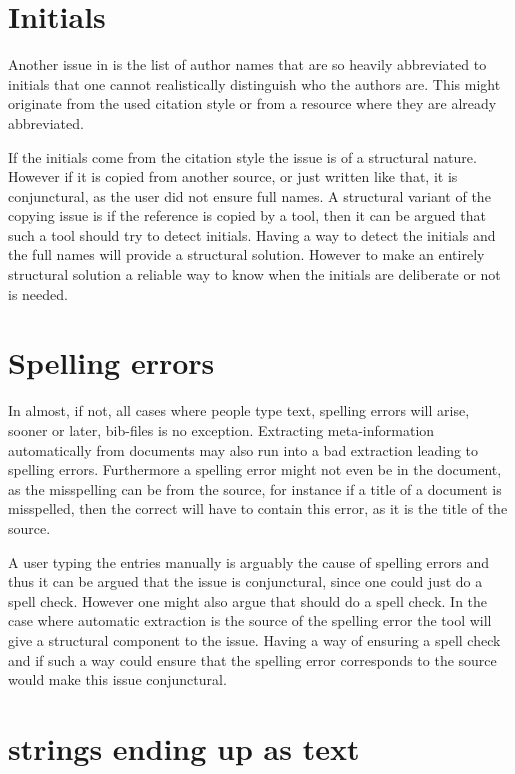 \section{Initials}
\label{sec:problems_initials}

Another issue in  is the list of author
names that are so heavily abbreviated to initials that one cannot
realistically distinguish who the authors are.  This might originate
from the used citation style or from a resource where they are already
abbreviated.

If the initials come from the citation style the issue is of a
structural nature.  However if it is copied from another source, or
just written like that, it is conjunctural, as the user did not ensure
full names.  A structural variant of the copying issue is if the
reference is copied by a tool, then it can be argued that such a tool
should try to detect initials.  Having a way to detect the initials
and the full names will provide a structural solution.  However to
make an entirely structural solution a reliable way to know when the
initials are deliberate or not is needed.


\section{Spelling errors}
\label{sec:problems_spelling}

In almost, if not, all cases where people type text, spelling errors
will arise, sooner or later, bib-files is no exception.  Extracting
meta-information automatically from documents may also run into a bad
extraction leading to spelling errors.  Furthermore a spelling error
might not even be in the {\bibtex} document, as the misspelling can be
from the source, for instance if a title of a document is misspelled,
then the correct {\bibtex} will have to contain this error, as it is
the title of the source.

A user typing the entries manually is arguably the cause of spelling
errors and thus it can be argued that the issue is conjunctural, since
one could just do a spell check.  However one might also argue that
{\bibtex} should do a spell check.  In the case where automatic
extraction is the source of the spelling error the tool will give a
structural component to the issue.  Having a way of ensuring a spell
check and if such a way could ensure that the spelling error
corresponds to the source would make this issue conjunctural.


\section{{\bibtex} strings ending up as text}
\label{sec:problems_strings_as_text}


